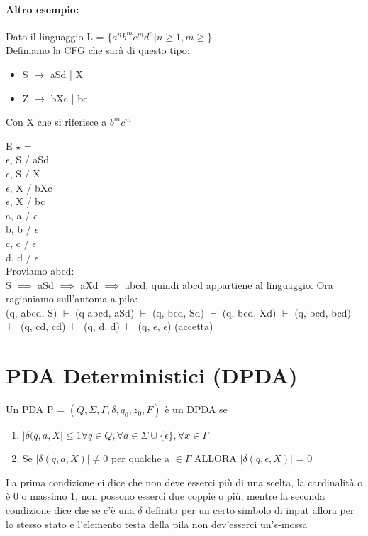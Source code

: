\documentclass[12pt, a4paper, openany, oneside]{book}
\begin{document}
\paragraph{Altro esempio: }Dato il linguaggio L = 
$\{a^{n}b^{m}c^{m}d^{n} | n \geq 1, m \geq \}$\\
Definiamo la CFG che sarà di questo tipo: 
\begin{itemize}
	\item S $\to$ aSd | X
	\item Z $\to$ bXc | bc
\end{itemize}
Con X che si riferisce a $b^{m}c^{m}$ 
\begin{center}
\end{center}
E $\star$ = \\
$\epsilon$, S / aSd \\
$\epsilon$, S / X \\
$\epsilon$, X / bXc \\
$\epsilon$, X / bc \\
a, a / $\epsilon$ \\
b, b / $\epsilon$ \\
c, c / $\epsilon$ \\
d, d / $\epsilon$ \\
Proviamo abcd:\\
S $\implies$ aSd $\implies$ aXd $\implies$ abcd, quindi abcd appartiene al 
linguaggio. Ora ragioniamo sull'automa a pila:\\
(q, abcd, S) $\vdash$ (q abcd, aSd) $\vdash$ (q, bcd, Sd) $\vdash$ (q, bcd, Xd)
$\vdash$ (q, bcd, bcd) $\vdash$ (q, cd, cd) $\vdash$ (q, d, d) $\vdash$
(q, $\epsilon$, $\epsilon$) (accetta)
\section{PDA Deterministici (DPDA)}
Un PDA P = $(Q, \Sigma, \Gamma, \delta, q_{0}, z_{0}, F)$ è un DPDA se
\begin{enumerate}
	\item $|\delta(q,a,X| \leq 1 \forall q \in Q, \forall a \in \Sigma \cup 
	\{\epsilon\}, \forall x \in \Gamma$
	\item Se $|\delta(q, a, X)| \neq 0$ per qualche a $\in \Gamma$ ALLORA 
	$|\delta(q, \epsilon, X)|$ = 0
\end{enumerate}
La prima condizione ci dice che non deve esserci più di una scelta, la cardinalità
o è 0 o massimo 1, non possono esserci due coppie o più, mentre la seconda 
condizione dice che se c'è una $\delta$ definita per un certo simbolo di input
allora per lo stesso stato e l'elemento testa della pila non dev'esserci 
un'$\epsilon$-mossa
\end{document}
